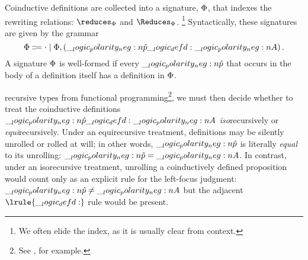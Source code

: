 

Coinductive definitions are collected into a signature, $\Phi$, that indexes the rewriting relations: $\reduces_{\orsig}$ and $\Reduces_{\orsig}$.%
\footnote{We often elide the index, as it is usually clear from context.}
Syntactically, these signatures are given by the grammar
\begin{equation*}
  \Phi \Coloneqq \cdot \mid \Phi, (\__logic_polarity_neg:n {\hat{p}} \__logic_defd: \__logic_polarity_neg:n {A})
  \,.
\end{equation*}
A signature $\Phi$ is well-formed if every $\__logic_polarity_neg:n {\hat{p}}$ that occurs in the body of a definition itself has a definition in $\Phi$.

 recursive types from functional programming\footnote{See \textcite{Pierce:MIT02}, for example.}, we must then decide whether to treat the coinductive definitions $\__logic_polarity_neg:n {\hat{p}} \__logic_defd: \__logic_polarity_neg:n {A}$ \emph{iso}\-recursively or \emph{equi}\-recursively.
Under an equirecursive treatment, definitions may be silently unrolled or rolled at will;
in other words, $\__logic_polarity_neg:n {\hat{p}}$ is literally \emph{equal} to its unrolling: $\__logic_polarity_neg:n {\hat{p}} = \__logic_polarity_neg:n {A}$.
In contrast, under an isorecursive treatment, unrolling a coinductively defined proposition would count only as an explicit rule for the left-focus judgment: $\__logic_polarity_neg:n {\hat{p}} \neq \__logic_polarity_neg:n {A}$ but the adjacent $\lrule{\defd}$ rule would be present.%

